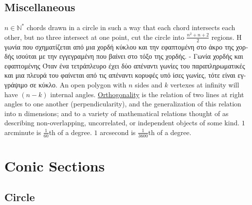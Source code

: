 \documentclass[12pt]{article}
\begin{document}
\begin{flushleft}
	
	\subsection{Miscellaneous} 
	
	\textbullet \quad $n \in \mathbb{N}^*$ chords drawn in a circle in such a way that each chord intersects each other, but no three intersect at one point, cut the circle into $\displaystyle \frac{n^2 + n + 2}{2} $ regions. \linebreak 
	\textbullet \quad \textgreek{Η γωνία που σχηματίζεται από μια χορδή κύκλου και την εφαπτομένη στο άκρο της χορδής ισούται με την εγγεγραμένη που βαίνει στο τόξο της χορδής. - Γωνία χορδής και εφαπτομένης} \linebreak  
	\textbullet \quad \textgreek{Όταν ένα τετράπλευρο έχει δύο απέναντι γωνίες του παραπληρωματικές και μια πλευρά του φαίνεται από τις απέναντι κορυφές υπό ίσες γωνίες, τότε είναι εγγράψιμο σε κύκλο.} \linebreak  
	\textbullet \quad An open polygon with $n$ sides and $k$ vertexes at infinity will have $(n-k)$ internal angles. \linebreak 
	\textbullet \quad \uline{Orthogonality} is the relation of two lines at right angles to one another (perpendicularity), and the generalization of this relation into n dimensions; and to a variety of mathematical relations thought of as describing non-overlapping, uncorrelated, or independent objects of some kind. \linebreak 
	\textbullet \quad $1$ arcminute is $\frac{1}{60}$th of a degree. $1$ arcsecond is $\frac{1}{3600}$th of a degree. 
	
	
	\pagebreak
	

	\section{Conic Sections}	
	
	\subsection{Circle}


\end{flushleft}
\end{document}
